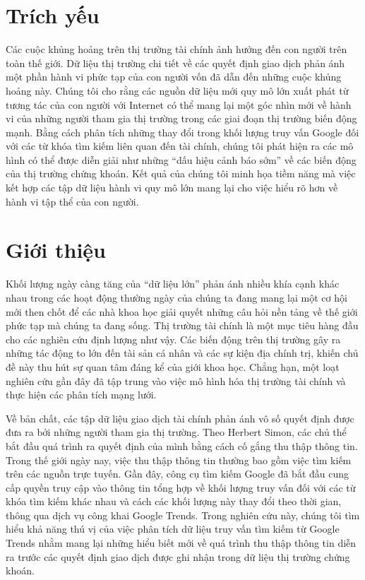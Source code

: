 \section{Trích yếu}

Các cuộc khủng hoảng trên thị trường tài chính ảnh hưởng đến con người trên toàn thế giới. Dữ liệu thị trường chi tiết về các quyết định giao dịch phản ánh một phần hành vi phức tạp của con người vốn đã dẫn đến những cuộc khủng hoảng này. Chúng tôi cho rằng các nguồn dữ liệu mới quy mô lớn xuất phát từ tương tác của con người với Internet có thể mang lại một góc nhìn mới về hành vi của những người tham gia thị trường trong các giai đoạn thị trường biến động mạnh. Bằng cách phân tích những thay đổi trong khối lượng truy vấn Google đối với các từ khóa tìm kiếm liên quan đến tài chính, chúng tôi phát hiện ra các mô hình có thể được diễn giải như những ``dấu hiệu cảnh báo sớm'' về các biến động của thị trường chứng khoán. Kết quả của chúng tôi minh họa tiềm năng mà việc kết hợp các tập dữ liệu hành vi quy mô lớn mang lại cho việc hiểu rõ hơn về hành vi tập thể của con người.

\section{Giới thiệu}

Khối lượng ngày càng tăng của ``dữ liệu lớn'' phản ánh nhiều khía cạnh khác nhau trong các hoạt động thường ngày của chúng ta đang mang lại một cơ hội mới then chốt để các nhà khoa học giải quyết những câu hỏi nền tảng về thế giới phức tạp mà chúng ta đang sống. Thị trường tài chính là một mục tiêu hàng đầu cho các nghiên cứu định lượng như vậy. Các biến động trên thị trường gây ra những tác động to lớn đến tài sản cá nhân và các sự kiện địa chính trị, khiến chủ đề này thu hút sự quan tâm đáng kể của giới khoa học. Chẳng hạn, một loạt nghiên cứu gần đây đã tập trung vào việc mô hình hóa thị trường tài chính và thực hiện các phân tích mạng lưới.

Về bản chất, các tập dữ liệu giao dịch tài chính phản ánh vô số quyết định được đưa ra bởi những người tham gia thị trường. Theo Herbert Simon, các chủ thể bắt đầu quá trình ra quyết định của mình bằng cách cố gắng thu thập thông tin. Trong thế giới ngày nay, việc thu thập thông tin thường bao gồm việc tìm kiếm trên các nguồn trực tuyến. Gần đây, công cụ tìm kiếm Google đã bắt đầu cung cấp quyền truy cập vào thông tin tổng hợp về khối lượng truy vấn đối với các từ khóa tìm kiếm khác nhau và cách các khối lượng này thay đổi theo thời gian, thông qua dịch vụ công khai Google Trends. Trong nghiên cứu này, chúng tôi tìm hiểu khả năng thú vị của việc phân tích dữ liệu truy vấn tìm kiếm từ Google Trends nhằm mang lại những hiểu biết mới về quá trình thu thập thông tin diễn ra trước các quyết định giao dịch được ghi nhận trong dữ liệu thị trường chứng khoán.


